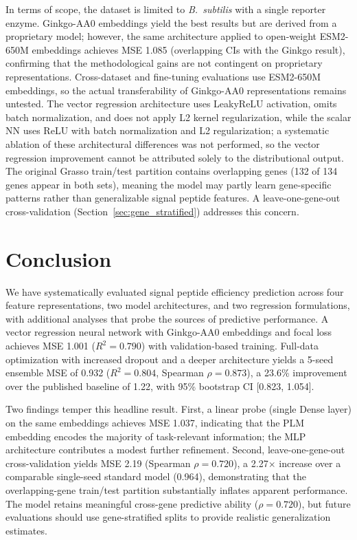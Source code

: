 \documentclass[12pt]{article}
\begin{document}
In terms of scope, the dataset is limited to \textit{B.\ subtilis} with a single reporter enzyme.
Ginkgo-AA0 embeddings yield the best results but are derived from a proprietary model; however, the same architecture applied to open-weight ESM2-650M embeddings achieves MSE 1.085 (overlapping CIs with the Ginkgo result), confirming that the methodological gains are not contingent on proprietary representations.
Cross-dataset and fine-tuning evaluations use ESM2-650M embeddings, so the actual transferability of Ginkgo-AA0 representations remains untested.
The vector regression architecture uses LeakyReLU activation, omits batch normalization, and does not apply L2 kernel regularization,
while the scalar NN uses ReLU with batch normalization and L2 regularization; a systematic ablation of these
architectural differences was not performed, so the vector regression improvement cannot
be attributed solely to the distributional output.
The original Grasso train/test partition contains overlapping genes (132 of 134 genes appear in both sets), meaning the model may partly learn gene-specific patterns rather than generalizable signal peptide features.
A leave-one-gene-out cross-validation (Section~\ref{sec:gene_stratified}) addresses this concern.

\section{Conclusion}
\label{sec:conclusion}

We have systematically evaluated signal peptide efficiency prediction across four feature representations, two model architectures, and two regression formulations, with additional analyses that probe the sources of predictive performance.
A vector regression neural network with Ginkgo-AA0 embeddings and focal loss achieves MSE 1.001 ($R^2 = 0.790$) with validation-based training.
Full-data optimization with increased dropout and a deeper architecture yields a 5-seed ensemble MSE of 0.932 ($R^2 = 0.804$, Spearman $\rho = 0.873$), a 23.6\% improvement over the published baseline of 1.22, with 95\% bootstrap CI [0.823, 1.054].

Two findings temper this headline result.
First, a linear probe (single Dense layer) on the same embeddings achieves MSE 1.037, indicating that the PLM embedding encodes the majority of task-relevant information; the MLP architecture contributes a modest further refinement.
Second, leave-one-gene-out cross-validation yields MSE 2.19 (Spearman $\rho = 0.720$), a 2.27$\times$ increase over a comparable single-seed standard model (0.964), demonstrating that the overlapping-gene train/test partition substantially inflates apparent performance.
The model retains meaningful cross-gene predictive ability ($\rho = 0.720$), but future evaluations should use gene-stratified splits to provide realistic generalization estimates.
\end{document}
